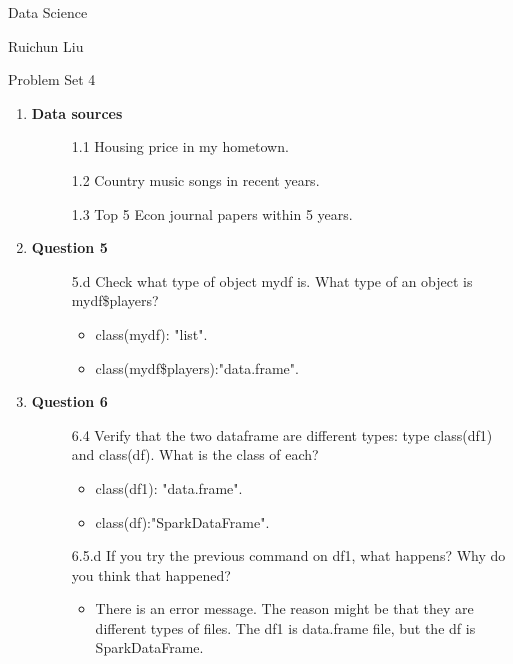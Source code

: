 \documentclass[11pt,a4paper]{article}
\begin{document}
	\begin{center}
		Data Science
		
		Ruichun Liu
		
		Problem Set 4
	\end{center}
\begin{enumerate}

    \item \textbf{Data sources}
		  \begin{description}
	            \item[]	1.1 Housing price in my hometown.
                  	      
	            \item[] 1.2 Country music songs in recent years.
                  	  
	            \item[] 1.3 Top 5 Econ journal papers within 5 years.
                      
          \end{description}

    \item \textbf{Question 5}
		  \begin{description}
	            \item[]	5.d Check what type of object mydf is. What type of an object is mydf\$players?
                  	 \begin{itemize} 
	                       \item   class(mydf): "list".
	                       \item   class(mydf\$players):"data.frame".
                     \end{itemize}      
          \end{description}
          
    \item \textbf{Question 6}
		  \begin{description}
	            \item[]	6.4 Verify that the two dataframe are different types: type    class(df1) and class(df). What is the class of each?
                  	 \begin{itemize} 
	                       \item   class(df1): "data.frame".
	                       \item   class(df):"SparkDataFrame".
                     \end{itemize}  
                     
	            \item[] 6.5.d If you try the previous command on df1, what happens? Why do you think that happened?
                  	 \begin{itemize} 
	                       \item There is an error message. The reason might be that they are different types of files. The df1 is data.frame file, but the df is SparkDataFrame.
                     \end{itemize} 
                     

\end{description}
\end{enumerate}
\end{document}
